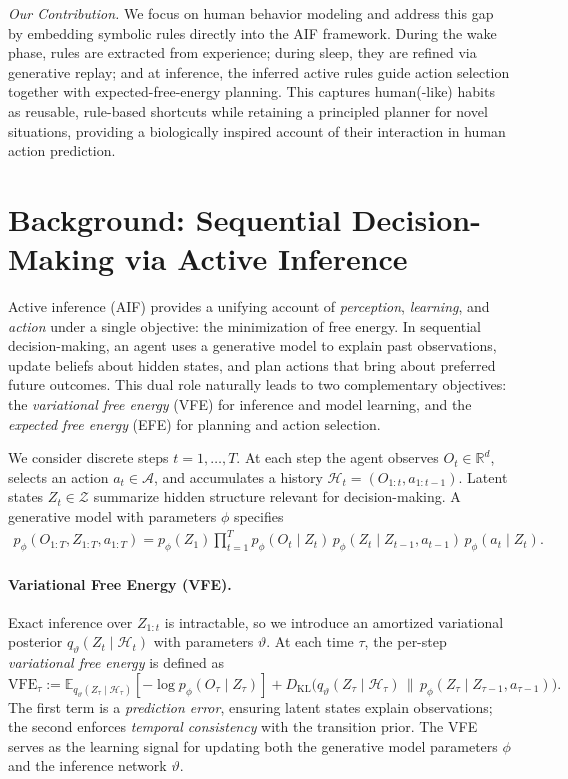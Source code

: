 \documentclass{article} %
\newcommand{\revise}[1]{#1}
\begin{document}
\textit{Our Contribution.} \revise{We focus on human behavior modeling} and address this gap by embedding symbolic rules directly into the AIF framework. During the wake phase, rules are extracted from experience; during sleep, they are refined via generative replay; and at inference, \revise{the inferred active rules guide action selection together with expected-free-energy planning}. \revise{This captures human(-like) habits as reusable, rule-based shortcuts while retaining a principled planner for novel situations, providing a biologically inspired account of their interaction in human action prediction.}

\section{Background: Sequential Decision-Making via Active Inference}
\label{sec:background}

Active inference (AIF) provides a unifying account of \emph{perception}, \emph{learning}, and \emph{action} under a single objective: the minimization of free energy.  
In sequential decision-making, an agent uses a generative model to explain past observations, update beliefs about hidden states, and plan actions that bring about preferred future outcomes.  
This dual role naturally leads to two complementary objectives: the \emph{variational free energy} (VFE) for inference and model learning, and the \emph{expected free energy} (EFE) for planning and action selection.  

We consider discrete steps $t=1,\dots,T$.  
At each step the agent observes $O_t \in \mathbb{R}^d$, selects an action $a_t \in \mathcal{A}$, and accumulates a history
$
\mathcal H_t = (O_{1:t}, a_{1:t-1}).
$
Latent states $Z_t \in \mathcal Z$ summarize hidden structure relevant for decision-making.  
A generative model with parameters $\phi$ specifies
{\small \begin{align}
\revise{p_\phi(O_{1:T}, Z_{1:T}, a_{1:T})
= p_\phi(Z_1) \prod_{t=1}^T p_\phi(O_t \mid Z_t)\,
p_\phi(Z_t \mid Z_{t-1},a_{t-1})\,
p_\phi(a_t \mid Z_t).}
\label{eq:generative_1}
\end{align}}
\paragraph{Variational Free Energy (VFE).}
Exact inference over $Z_{1:t}$ is intractable, so we introduce an amortized variational posterior 
$q_\vartheta(Z_t \mid \mathcal H_t)$ with parameters $\vartheta$.  
At each time $\tau$, the per-step \emph{variational free energy} is defined as
{\small\begin{equation}
\text{VFE}_\tau :=
\mathbb{E}_{q_\vartheta(Z_\tau\mid\mathcal H_\tau)}[-\log p_\phi(O_\tau\mid Z_\tau)]
+ D_{\mathrm{KL}}\!\big(q_\vartheta(Z_\tau\mid \mathcal H_\tau)\,\|\,p_\phi(Z_\tau\mid Z_{\tau-1},a_{\tau-1})\big).
\label{eq:per_step_VFE}
\end{equation}}
The first term is a \emph{prediction error}, ensuring latent states explain observations;  
the second enforces \emph{temporal consistency} with the transition prior.  
The VFE serves as the learning signal for updating both the generative model parameters $\phi$ and the inference network $\vartheta$.  
\end{document}
